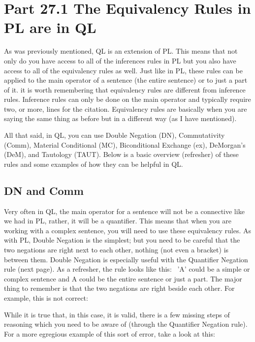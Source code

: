 \section{Part 27.1 The Equivalency Rules in PL are in QL}
As was previously mentioned, QL is an extension of PL. This means that not only do you have access to all of the inferences rules in PL but you also have access to all of the equivalency rules as well. Just like in PL, these rules can be applied to the main operator of a sentence (the entire sentence) or to just a part of it. it is worth remembering that equivalency rules are different from inference rules. Inference rules can only be done on the main operator and typically require two, or more, lines for the citation. Equivalency rules are basically when you are saying the same thing as before but in a different way (as I have mentioned). 

All that said, in QL, you can use Double Negation (DN), Commutativity (Comm), Material Conditional (MC), Biconditional Exchange (\eiff ex), DeMorgan's (DeM), and Tautology (TAUT). Below is a basic overview (refresher) of these rules and some examples of how they can be helpful in QL.

\subsection{DN and Comm}

Very often in QL, the main operator for a sentence will not be a connective like we had in PL, rather, it will be a quantifier. This means that when you are working with a complex sentence, you will need to use these equivalency rules. As with PL, Double Negation is the simplest; but you need to be careful that the two negations are right next to each other, nothing (not even a bracket) is between them. Double Negation is especially useful with the Quantifier Negation rule (next page). As a refresher, the rule looks like this: 
'A' could be a simple or complex sentence and A could be the entire sentence or just a part. The major thing to remember is that the two negations are right beside each other. For example, this is not correct:
\begin{fitchproof}
\end{fitchproof}
While it is true that, in this case, it is valid, there is a few missing steps of reasoning which you need to be aware of (through the Quantifier Negation rule). For a more egregious example of this sort of error, take a look at this: 
\begin{fitchproof}
\end{fitchproof}

